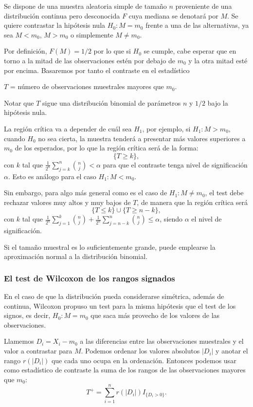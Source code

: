\documentclass[a4paper,12pt]{article}
\begin{document}
Se dispone de una muestra aleatoria simple de tamaño $n$ proveniente de una distribución continua pero desconocida $F$ cuya mediana se denotará por $M$. Se quiere contrastar la hipótesis nula $H_0: M=m_0$ frente a una de las alternativas, ya sea $M<m_0$, $M>m_0$ o simplemente $M\neq m_0$.

Por definición, $F(M)=1/2$ por lo que si $H_0$ se cumple, cabe esperar que en torno a la mitad de las observaciones estén por debajo de $m_0$ y la otra mitad esté por encima. Basaremos por tanto el contraste en el estadístico

\begin{center}
$T$ = número de observaciones muestrales mayores que $m_0$.
\end{center}

Notar que $T$ sigue una distribución binomial de parámetros $n$ y $1/2$ bajo la hipótesis nula.

La región crítica va a depender de cuál sea $H_1$, por ejemplo, si $H_1:M>m_0$, cuando $H_0$ no sea cierta, la muestra tenderá a presentar más valores superiores a $m_0$ de los esperados, por lo que la región crítica será de la forma:
$$\{T\geq k \},$$
con $k$ tal que $\frac{1}{2^n}\sum_{j=k}^{n} \binom{n}{j} < \alpha$ para que el contraste tenga nivel de significación $\alpha$. Esto es análogo para el caso $H_1: M< m_0$.

Sin embargo, para algo más general como es el caso de $H_1:M\neq m_0$, el test debe rechazar valores muy altos y muy bajos de $T$, de manera que la región crítica será 
    $$\{T\leq k\}\cup \{T\geq n - k \},$$
con $k$ tal que $\frac{1}{2^n}\sum_{j=1}^{k} \binom{n}{j} + \frac{1}{2^n}\sum_{j=n-k}^{n} \binom{n}{j} \leq \alpha$, siendo $\alpha$ el nivel de significación.

Si el tamaño muestral es lo suficientemente grande, puede emplearse la aproximación normal a la distribución binomial.

\subsubsection{El test de Wilcoxon de los rangos signados}
En el caso de que la distribución pueda considerarse simétrica, además de continua, Wilcoxon propuso un test para la misma hipótesis que el test de los signos, es decir, $H_0:M =m_0$ que saca más provecho de los valores de las observaciones.

Llamemos $D_i=X_i - m_0$ a las diferencias entre las observaciones muestrales y el valor a contrastar para $M$. Podemos ordenar los valores absolutos $|D_i|$ y anotar el rango $r(|D_i|)$ que cada uno ocupa en la ordenación.  Entonces podemos usar como estadístico de contraste la suma de los rangos de las observaciones mayores que $m_0$:
$$T^+ = \sum_{i =1}^{n} r(|D_i|)I_{\{D_i>0\}}.$$
\end{document}
